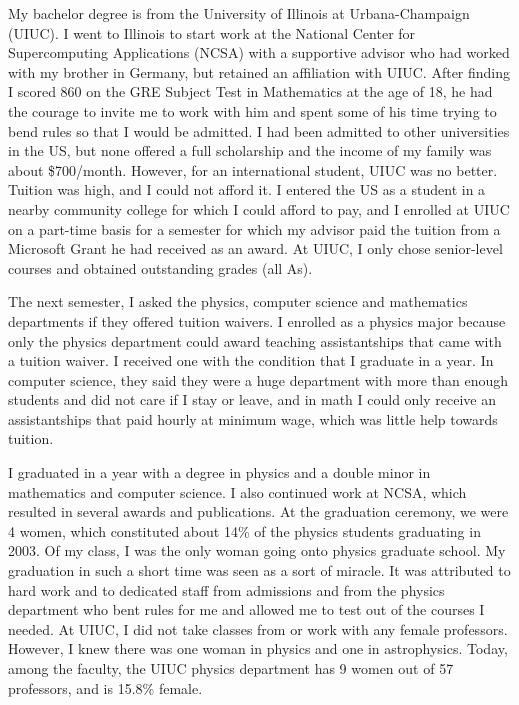 \documentclass[utf8]{frontiersSCNS} %
\begin{document}
My bachelor degree is from the University of Illinois at Urbana-Champaign (UIUC). I went to Illinois to start work at the National Center for Supercomputing Applications (NCSA) with a supportive advisor who had worked with my brother in Germany, but retained an affiliation with UIUC. After finding I scored 860 on the GRE Subject Test in Mathematics at the age of 18, he had the courage to invite me to work with him and spent some of his time trying to bend rules so that I would be admitted. I had been admitted to other universities in the US, but none offered a full scholarship and the income of my family was about \$700/month. However, for an international student, UIUC was no better. Tuition was high, and I could not afford it. I entered the US as a student in a nearby community college for which I could afford to pay, and I enrolled at UIUC on a part-time basis for a semester for which my advisor paid the tuition from a Microsoft Grant he had received as an award. At UIUC, I only chose senior-level courses and obtained outstanding grades (all As).

The next semester, I asked the physics, computer science and mathematics departments if they offered tuition waivers. I enrolled as a physics major because only the physics department could award teaching assistantships that came with a tuition waiver. I received one with the condition that I graduate in a year.  In computer science, they said they were a huge department with more than enough students and did not care if I stay or leave, and in math I could only receive an assistantships that paid hourly at minimum wage, which was little help towards tuition. %


I graduated in a year with a degree in physics and a double minor in mathematics and computer science. I also continued work at NCSA, which resulted in several awards and publications. At the graduation ceremony, we were 4 women, which constituted about 14\% of the physics students graduating in 2003. Of my class, I was the only woman going onto physics graduate school. My graduation in such a short time was seen as a sort of miracle. It was attributed to hard work and to dedicated staff from admissions and from the physics department who bent rules for me and allowed me to test out of the courses I needed. At UIUC, I did not take classes from or work with any female professors. However, I knew there was one woman in physics and one in astrophysics. Today, among the faculty, the UIUC physics department has 9 women out of 57 professors, and is 15.8\% female. 
\end{document}
